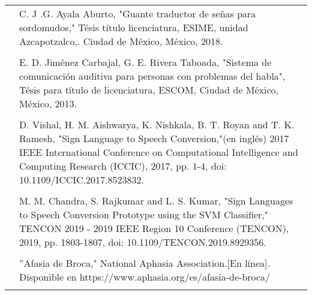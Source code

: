\begin{tabular}{p{0.5cm} p{14.8cm}}
	\text{[9]} & C. J .G. Ayala Aburto, "Guante traductor de señas para sordomudos," Tésis título licenciatura, ESIME, unidad Azcapotzalco,. Ciudad de México, México, 2018. \\ \\
	
	\text{[10]} & E. D. Jiménez Carbajal, G. E. Rivera Taboada, "Sistema de comunicación auditiva para personas con problemas del habla", Tésis para título de licenciatura, ESCOM, Ciudad de México, México, 2013. \\ \\
	
	\text{[11]} & D. Vishal, H. M. Aishwarya, K. Nishkala, B. T. Royan and T. K. Ramesh, "Sign Language to Speech Conversion,"(en inglés) 2017 IEEE International Conference on Computational Intelligence and Computing Research (ICCIC), 2017, pp. 1-4, doi: 10.1109/ICCIC.2017.8523832. \\ \\
	
	\text{[12]} & M. M. Chandra, S. Rajkumar and L. S. Kumar, "Sign Languages to Speech Conversion Prototype using the SVM Classifier," TENCON 2019 - 2019 IEEE Region 10 Conference (TENCON), 2019, pp. 1803-1807, doi: 10.1109/TENCON.2019.8929356. \\ \\
	
	\text{[13]} & ''Afasia de Broca," National Aphasia Association.[En línea]. Disponible en https://www.aphasia.org/es/afasia-de-broca/ \\ \\
	
\end{tabular}